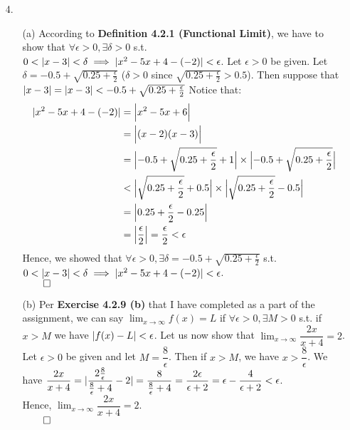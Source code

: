 \documentclass[11pt]{article}
\DeclarePairedDelimiter\abs{\lvert}{\rvert}%
\DeclarePairedDelimiter\absb{\Big\lvert}{\Big\rvert}%
\begin{document}
\begin{itemize}
    \item[4.]
        \begin{itemize}
            \item[(a)]
                According to \textbf{Definition 4.2.1 (Functional Limit)},
                we have to show that $\forall \epsilon > 0, \exists \delta > 0$
                s.t. $0 < \abs{x - 3} < \delta \implies \abs{x^2 - 5x + 4 -
                (-2)} < \epsilon$. Let $\epsilon > 0$ be given. Let
                $\delta = -0.5 + \sqrt{0.25 + \frac{\epsilon}{2}}$
                ($\delta > 0$ since $\sqrt{0.25 + \frac{\epsilon}{2}} > 0.5$).
                Then suppose that $\abs{x - 3} = \abs{x - 3} < -0.5 +
                \sqrt{0.25 + \frac{\epsilon}{2}}$
                Notice that:
                \begin{align*}
                    \abs{x^2 - 5x + 4 - (-2)} &= \absb{x^2 - 5x + 6}\\
                                              &= \absb{(x - 2)(x - 3)}\\
                                              &= \absb{-0.5 + \sqrt{0.25 + \frac{\epsilon}{2}} + 1} \times \absb{-0.5 + \sqrt{0.25 + \frac{\epsilon}{2}}}\\
                                              &< \absb{\sqrt{0.25 + \frac{\epsilon}{2}} + 0.5} \times \absb{\sqrt{0.25 + \frac{\epsilon}{2}} - 0.5}\\
                                              &= \absb{0.25 + \frac{\epsilon}{2} - 0.25}\\
                                              &= \absb{\frac{\epsilon}{2}} = \frac{\epsilon}{2} < \epsilon
                \end{align*}
                Hence, we showed that $\forall \epsilon > 0, \exists \delta =
                -0.5 + \sqrt{0.25 + \frac{\epsilon}{2}}$ s.t.
                $0 < \abs{x - 3} < \delta \implies \abs{x^2 - 5x + 4 - (-2)} <
                \epsilon$.\\
                $\qed$

            \item[(b)]
                Per \textbf{Exercise 4.2.9 (b)} that I have completed as a part
                of the assignment, we can say $\lim_{x \to \infty} f(x) = L$ if
                $\forall \epsilon > 0, \exists M > 0$ s.t. if $x > M$ we have
                $\abs{f(x) - L} < \epsilon$. Let us now show that $\lim_{x \to
                \infty} \dfrac{2x}{x + 4} = 2$. Let $\epsilon > 0$ be given and
                let $M = \dfrac{8}{\epsilon}$. Then if $x > M$, we have
                $x > \dfrac{8}{\epsilon}$. We have
                $\dfrac{2x}{x + 4} =
                \abs{\dfrac{2 \frac{8}{\epsilon}}{\frac{8}{\epsilon} + 4}  - 2}
                = \dfrac{8}{\frac{8}{\epsilon} + 4} =
                \dfrac{2\epsilon}{\epsilon + 2} =
                \epsilon - \dfrac{4}{\epsilon + 2} < \epsilon$.\\
                Hence, $\lim_{x \to \infty} \dfrac{2x}{x + 4} = 2$.\\
                $\qed$
        \end{itemize}


\end{itemize}
\end{document}
